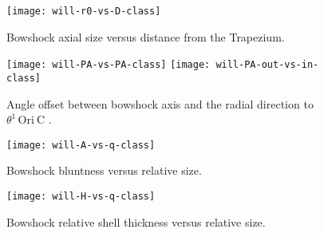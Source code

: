 \documentclass[iop, apj]{emulateapj}
\newcommand\thC{\ensuremath{\theta^1\,\mathrm{Ori~C}}}
\begin{document}
\begin{figure}
  \centering
  \texttt{[image: will-r0-vs-D-class]}
  \caption{Bowshock axial size versus distance from the Trapezium.}
  \label{fig:size-v-distance}
\end{figure}
\begin{figure}
  \centering
  \texttt{[image: will-PA-vs-PA-class]}
  \texttt{[image: will-PA-out-vs-in-class]}
  \caption{Angle offset between bowshock axis and the radial direction to \thC{} .}
  \label{fig:PA-v-PA}
\end{figure}
\begin{figure}
  \centering
  \texttt{[image: will-A-vs-q-class]}
  \caption{Bowshock bluntness versus relative size.}
  \label{fig:A-v-q}
\end{figure}
\begin{figure}
  \centering
  \texttt{[image: will-H-vs-q-class]}
  \caption{Bowshock relative shell thickness versus relative size.}
  \label{fig:PA-v-PA}
\end{figure}


\end{document}
